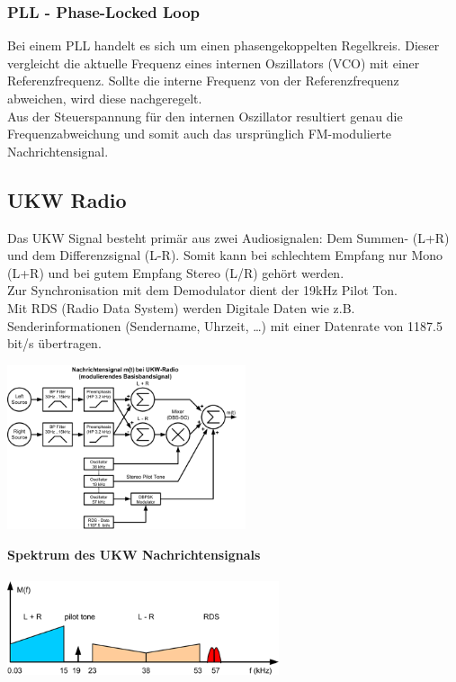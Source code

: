 \subsubsection{PLL - Phase-Locked Loop}
Bei einem PLL handelt es sich um einen phasengekoppelten Regelkreis. Dieser vergleicht die
aktuelle Frequenz eines internen Oszillators (VCO) mit einer Referenzfrequenz. Sollte die
interne Frequenz von der Referenzfrequenz abweichen, wird diese nachgeregelt. \\
Aus der Steuerspannung für den internen Oszillator resultiert genau die Frequenzabweichung und
somit auch das ursprünglich FM-modulierte Nachrichtensignal.\\


\subsection{UKW Radio}
Das UKW Signal besteht primär aus zwei Audiosignalen: Dem Summen- (L+R) und dem Differenzsignal (L-R).
Somit kann bei schlechtem Empfang nur Mono (L+R) und bei gutem Empfang Stereo (L/R) gehört werden. \\
Zur Synchronisation mit dem Demodulator dient der 19kHz Pilot Ton. \\
Mit RDS (Radio Data System) werden Digitale Daten wie z.B. Senderinformationen (Sendername, Uhrzeit,
\ldots) mit einer Datenrate von 1187.5 bit/s übertragen. \\
\begin{minipage}{9cm}
	\includegraphics[width=7cm]{bilder/ukw_blockdiagramm.png}
\end{minipage}
\begin{minipage}{9cm} 
	\textbf{Spektrum des UKW Nachrichtensignals} \\ \\
    \includegraphics[width=8cm]{bilder/ukw_spektrum.png}
\end{minipage}